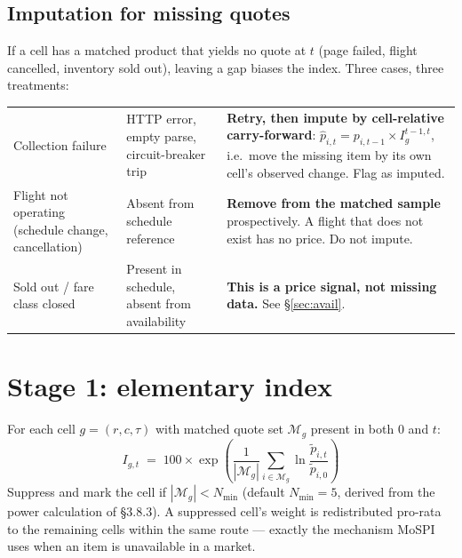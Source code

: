 \subsection{Imputation for missing quotes}

If a cell has a matched product that yields no quote at $t$ (page failed, flight cancelled,
inventory sold out), leaving a gap biases the index. Three cases, three treatments:

\begin{center}
\small
\begin{tabularx}{\textwidth}{@{}L{3.6cm} L{4.2cm} X@{}}
\toprule
{} &  &  \\
\midrule
Collection failure & HTTP error, empty parse, circuit-breaker trip & \textbf{Retry, then impute by cell-relative carry-forward}: $\hat p_{i,t} = p_{i,t-1}\times I_g^{t-1,t}$, i.e.\ move the missing item by its own cell's observed change. Flag as imputed. \\
\addlinespace[2pt]
Flight not operating (schedule change, cancellation) & Absent from schedule reference & \textbf{Remove from the matched sample} prospectively. A flight that does not exist has no price. Do not impute. \\
\addlinespace[2pt]
Sold out / fare class closed & Present in schedule, absent from availability & \textbf{This is a price signal, not missing data.} See \S\ref{sec:avail}. \\
\bottomrule
\end{tabularx}
\end{center}

\section{Stage 1: elementary index}

For each cell $g=(r,c,\tau)$ with matched quote set $\mathcal{M}_g$ present in both $0$
and $t$:
\begin{equation}
\boxed{\;
I_{g,t} \;=\; 100 \times \exp\!\left(\frac{1}{|\mathcal{M}_g|}\sum_{i\in\mathcal{M}_g}
\ln\frac{\tilde p_{i,t}}{\tilde p_{i,0}}\right)\;}
\end{equation}
Suppress and mark the cell if $|\mathcal{M}_g| < N_{\min}$ (default $N_{\min}=5$, derived
from the power calculation of \S3.8.3). A suppressed cell's weight is redistributed
pro-rata to the remaining cells within the same route --- exactly the mechanism MoSPI uses
when an item is unavailable in a market.

